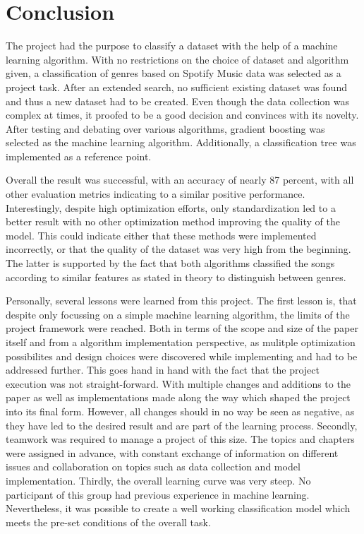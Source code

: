 \section{Conclusion}

        The project had the purpose to classify a dataset with the help of a machine learning algorithm. With no restrictions on the choice of dataset and algorithm given, 
        a classification of genres based on Spotify Music data was selected as a project task. After an extended search, 
        no sufficient existing dataset was found and thus a new dataset had to be created. Even though the data collection was complex at times, 
        it proofed to be a good decision and convinces with its novelty. After testing and debating over various algorithms, gradient boosting was
        selected as the machine learning algorithm. Additionally, a classification tree was implemented as a reference point.

        Overall the result was successful, with an accuracy of nearly 87 percent, with all other evaluation metrics indicating to a similar positive performance.
        Interestingly, despite high optimization efforts, only standardization led to a better result with no other optimization method improving the quality of the model. 
        This could indicate either that these methods were implemented incorrectly, or that the quality of the dataset was very high from the beginning. 
        The latter is supported by the fact that both algorithms classified the songs according to similar features as stated in theory to distinguish between genres.

        Personally, several lessons were learned from this project. The first lesson is, that despite only focussing on a 
        simple machine learning algorithm, the limits of the project framework were reached. Both in terms of the scope and size of the
        paper itself and from a algorithm implementation perspective, as mulitple optimization possibilites and design choices were 
        discovered while implementing and had to be addressed further. This goes hand in hand with the fact that the project execution was not straight-forward.
        With multiple changes and additions to the paper as well as implementations made along the way which shaped the 
        project into its final form. However, all changes should in no way be seen as negative, as they have led to the desired result and 
        are part of the learning process.
        Secondly, teamwork was required to manage a project of this size. The topics and chapters were assigned in advance, with constant exchange 
        of information on different issues and collaboration on topics such as data collection and model implementation.
        Thirdly, the overall learning curve was very steep. No participant of this group had previous experience in machine learning.
        Nevertheless, it was possible to create a well working classification model which meets the pre-set conditions of the overall task.

